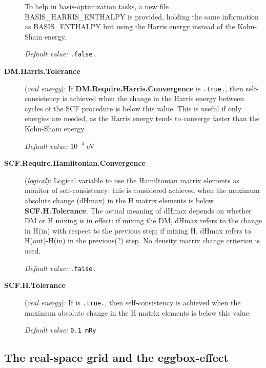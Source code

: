 \begin{description}
To help in basis-optimization tasks, a new file BASIS\_HARRIS\_ENTHALPY
is provided, holding the same information as BASIS\_ENTHALPY but using
the Harris energy instead of the Kohn-Sham energy.

\textit{Default value:} \texttt{.false.}


\item[\textbf{DM.Harris.Tolerance}] (\textit{real energy}):
If \textbf{DM.Require.Harris.Convergence} is \texttt{.true.}, then
self-consistency is achieved when the change in the Harris energy between cycles
of the SCF procedure is below this value.
This is useful if only energies are needed, as the Harris energy tends
to converge faster than the Kohn-Sham energy.

\textit{Default value:} {$10^{-4}$ eV}

\item[\textbf{SCF.Require.Hamiltonian.Convergence}] (\textit{logical}):
   Logical variable to use the
  Hamiltonian matrix elements as monitor of self-consistency: this is
  considered achieved when the maximum absolute change (dHmax) in the
  H matrix elements is below \textbf{SCF.H.Tolerance}.  The actual
  meaning of dHmax depends on whether DM or H mixing is in effect: if
  mixing the DM, dHmax refers to the change in H(in) with respect to
  the previous step; if mixing H, dHmax refers to H(out)-H(in) in the
  previous(?) step. No density matrix change criterion is used.

\textit{Default value:} \texttt{.false.}


\item[\textbf{SCF.H.Tolerance}] (\textit{real energy}):
   If  is \texttt{.true.}, then
  self-consistency is achieved when the maximum absolute change in the
  H matrix elements is below this value.

\textit{Default value:} \texttt{0.1 mRy}

\end{description}

\vspace{5pt}
\subsection{The real-space grid and the eggbox-effect}

